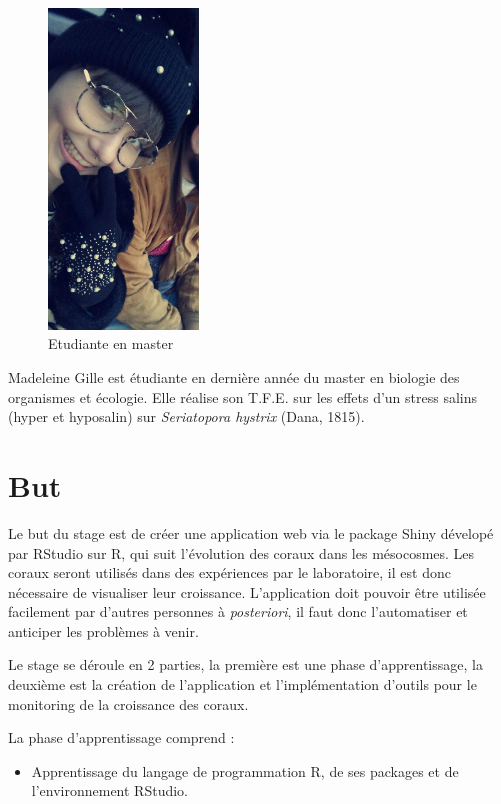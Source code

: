 \documentclass[]{report}
\providecommand{\tightlist}{%
  \setlength{\itemsep}{0pt}\setlength{\parskip}{0pt}}
\begin{document}
\begin{figure}[h!]
\includegraphics[width=4cm]{../image/madeleine.jpg}
\caption{Etudiante en master}
\end{figure}

Madeleine Gille est étudiante en dernière année du master en biologie
des organismes et écologie. Elle réalise son T.F.E. sur les effets d'un
stress salins (hyper et hyposalin) sur \emph{Seriatopora hystrix} (Dana,
1815).

\chapter{But}\label{but}

Le but du stage est de créer une application web via le package Shiny
dévelopé par RStudio sur R, qui suit l'évolution des coraux dans les
mésocosmes. Les coraux seront utilisés dans des expériences par le
laboratoire, il est donc nécessaire de visualiser leur croissance.
L'application doit pouvoir être utilisée facilement par d'autres
personnes à \emph{posteriori}, il faut donc l'automatiser et anticiper
les problèmes à venir.

Le stage se déroule en 2 parties, la première est une phase
d'apprentissage, la deuxième est la création de l'application et
l'implémentation d'outils pour le monitoring de la croissance des
coraux.

La phase d'apprentissage comprend :

\begin{itemize}
\tightlist
\item
  Apprentissage du langage de programmation R, de ses packages et de
  l'environnement RStudio.
\end{itemize}
\end{document}
